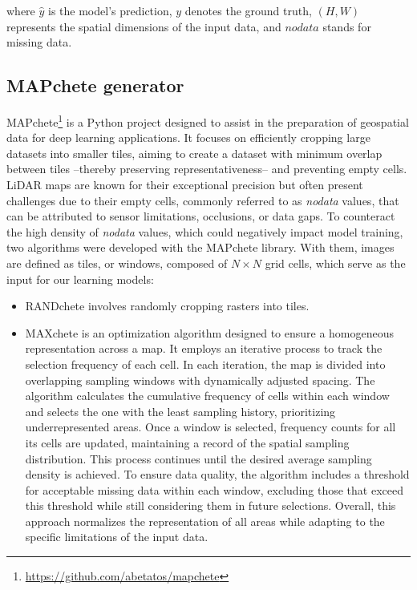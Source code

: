 \documentclass[preprint,12pt]{elsarticle}
\begin{document}
\noindent where $\hat{y}$ is the model's prediction, $y$ denotes the ground truth, $(H, W)$ represents the spatial dimensions of the input data, and $nodata$ stands for missing data.

\subsection{MAPchete generator}
\label{subsec:mapchete}

MAPchete\footnote{\url{https://github.com/abetatos/mapchete}} is a Python project designed to assist in the preparation of geospatial data for deep learning applications. It focuses on efficiently cropping large datasets into smaller tiles, aiming to create a dataset with minimum overlap between tiles --thereby preserving representativeness-- and preventing empty cells. LiDAR maps are known for their exceptional precision but often present challenges due to their empty cells, commonly referred to as \textit{nodata} values, that can be attributed to sensor limitations, occlusions, or data gaps. To counteract the high density of \textit{nodata} values, which could negatively impact model training, two algorithms were developed with the MAPchete library. With them, images are defined as tiles, or windows, composed of $N\times N$ grid cells, which serve as the input for our learning models:

\begin{itemize}
\item RANDchete involves randomly cropping rasters into tiles.
\item MAXchete is an optimization algorithm designed to ensure a homogeneous representation across a map. It employs an iterative process to track the selection frequency of each cell. In each iteration, the map is divided into overlapping sampling windows with dynamically adjusted spacing. The algorithm calculates the cumulative frequency of cells within each window and selects the one with the least sampling history, prioritizing underrepresented areas. Once a window is selected, frequency counts for all its cells are updated, maintaining a record of the spatial sampling distribution. This process continues until the desired average sampling density is achieved. To ensure data quality, the algorithm includes a threshold for acceptable missing data within each window, excluding those that exceed this threshold while still considering them in future selections. Overall, this approach normalizes the representation of all areas while adapting to the specific limitations of the input data.
\end{itemize}
\end{document}
